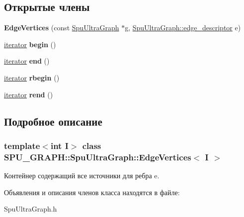 \subsection*{Открытые члены}
\begin{DoxyCompactItemize}
\item 
\mbox{\label{class_s_p_u___g_r_a_p_h_1_1_spu_ultra_graph_1_1_edge_vertices_a5f46b2bd30b600f3ac84ff3af6804331}} 
{\bfseries Edge\+Vertices} (const \hyperlink{class_s_p_u___g_r_a_p_h_1_1_spu_ultra_graph}{Spu\+Ultra\+Graph} $\ast$g, \hyperlink{class_s_p_u___g_r_a_p_h_1_1_spu_ultra_graph_a5f3776e003ef0a1648f1d9f84289810b}{Spu\+Ultra\+Graph\+::edge\+\_\+descriptor} e)
\item 
\mbox{\label{class_s_p_u___g_r_a_p_h_1_1_spu_ultra_graph_1_1_edge_vertices_a436d1084d81c01646f2ed88520909c16}} 
\hyperlink{class_s_p_u___g_r_a_p_h_1_1_spu_ultra_graph_1_1_edge_vertices_iterator}{iterator} {\bfseries begin} ()
\item 
\mbox{\label{class_s_p_u___g_r_a_p_h_1_1_spu_ultra_graph_1_1_edge_vertices_ae3d69f0dca98f169ed2267a14dd81261}} 
\hyperlink{class_s_p_u___g_r_a_p_h_1_1_spu_ultra_graph_1_1_edge_vertices_iterator}{iterator} {\bfseries end} ()
\item 
\mbox{\label{class_s_p_u___g_r_a_p_h_1_1_spu_ultra_graph_1_1_edge_vertices_afc0ed5eee0521e7b83bfb25a604b5c88}} 
\hyperlink{class_s_p_u___g_r_a_p_h_1_1_spu_ultra_graph_1_1_edge_vertices_iterator}{iterator} {\bfseries rbegin} ()
\item 
\mbox{\label{class_s_p_u___g_r_a_p_h_1_1_spu_ultra_graph_1_1_edge_vertices_a3b2972bf4010a0585f3c7ceb0bb66620}} 
\hyperlink{class_s_p_u___g_r_a_p_h_1_1_spu_ultra_graph_1_1_edge_vertices_iterator}{iterator} {\bfseries rend} ()
\end{DoxyCompactItemize}


\subsection{Подробное описание}
\subsubsection*{template$<$int I$>$\newline
class S\+P\+U\+\_\+\+G\+R\+A\+P\+H\+::\+Spu\+Ultra\+Graph\+::\+Edge\+Vertices$<$ I $>$}

Контейнер содержащий все источники для ребра e. 

Объявления и описания членов класса находятся в файле\+:\begin{DoxyCompactItemize}
\item 
Spu\+Ultra\+Graph.\+h\end{DoxyCompactItemize}
